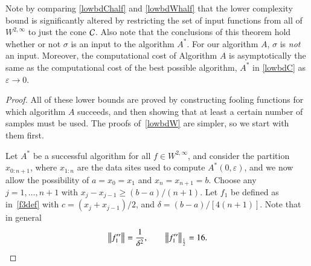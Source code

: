 \documentclass[review]{elsarticle}
\newcommand{\abstol}{\varepsilon}
\theoremstyle{definition}
\renewcommand{\cw}{W}
\begin{document}
Note by comparing \eqref{lowbdChalf} and \eqref{lowbdWhalf} that the lower complexity bound is significantly altered by restricting the
set of input functions from all of $ \cw^{2,\infty}$ to just the cone
$\cc$. Also note that the
conclusions of this theorem hold whether or not $\sigma$ is an input to the
algorithm $A^*$. For our algorithm $A$, $\sigma$ is \emph{not} an input. Moreover, the computational cost of Algorithm $A$ is asymptotically
the same as the computational cost of the best possible algorithm, $A^*$ in \eqref{lowbdC} as $\abstol \to 0$.

\begin{proof}
	All of these lower bounds are proved by constructing fooling functions for which
	algorithm $A$ succeeds, and then showing that at least a certain number of
	samples must be used. The proofs of~\eqref{lowbdW} are simpler, so
	we start with them first.
		
	Let $A^*$ be a successful algorithm for all $f \in \cw^{2,\infty}$, and consider
	the partition $x_{0:n+1}$, where $x_{1:n}$ are the data sites
	used to compute $A^*(0,\abstol)$, and we now allow the possibility of $a = x_0=x_1$ and $x_n = x_{n+1} = b$. Choose any $j=1, \ldots, n+1$ with
	$x_j-x_{j-1} \ge (b-a)/(n+1)$. Let $f_1$ be defined as in~\eqref{f3def} with $c
	= (x_j+x_{j-1})/2$, and $\delta = (b-a)/[4(n+1)]$. Note that in general
	\begin{equation}
	\norm{f_1''} = \frac{1}{\delta^{2}}, \qquad \norm[\frac 12]{f_1''} = 16.
	\end{equation}


\end{proof}
\end{document}
